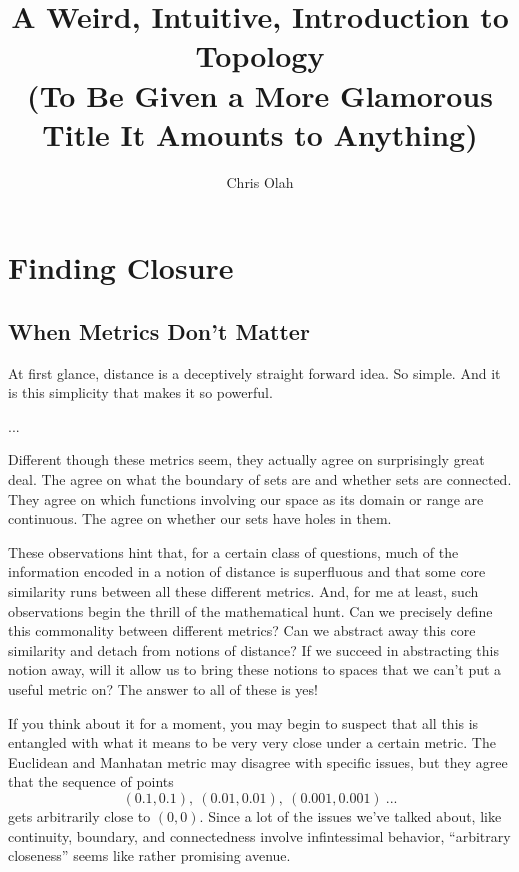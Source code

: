 \documentclass{report}
\begin{document}
\title{A Weird, Intuitive, Introduction to Topology\\{\small(To Be Given a More Glamorous Title It Amounts to Anything)}}
\author{Chris Olah}

\maketitle

\chapter{Finding Closure}

\section{When Metrics Don't Matter}

At first glance, distance is a deceptively straight forward idea. So simple. And it is this simplicity that makes it so powerful.

...

Different though these metrics seem, they actually agree on surprisingly great deal. The agree on what the boundary of sets are and whether sets are connected. They agree on which functions involving our space as its domain or range are continuous. The agree on whether our sets have holes in them.

These observations hint that, for a certain class of questions, much of the information encoded in a notion of distance is superfluous and that some core similarity runs between all these different metrics. And, for me at least, such observations begin the thrill of the mathematical hunt. Can we precisely define this commonality between different metrics? Can we abstract away this core similarity and detach from notions of distance? If we succeed in abstracting this notion away, will it allow us to bring these notions to spaces that we can't put a useful metric on? The answer to all of these is yes!

If you think about it for a moment, you may begin to suspect that all this is entangled with what it means to be very very close under a certain metric. The Euclidean and Manhatan metric may disagree with specific issues, but they agree that the sequence of points $$(0.1,0.1), ~ (0.01,0.01), ~ (0.001,0.001) ~...$$ gets arbitrarily close to $(0,0)$. Since a lot of the issues we've talked about, like continuity, boundary, and connectedness involve infintessimal behavior, ``arbitrary closeness'' seems like rather promising avenue.
\end{document}
